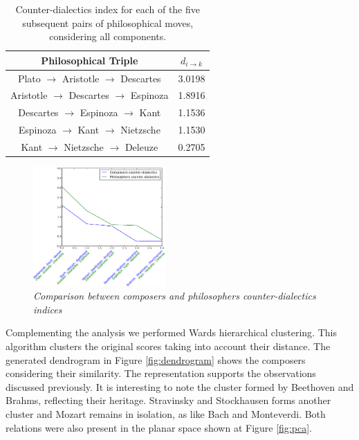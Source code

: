 \documentclass[
 aip,
 jmp,
 amsmath,amssymb,
 reprint,
]{revtex4-1}
\begin{document}
\begin{table}%
\caption{\label{tab:tablephiE} Counter-dialectics index for each
of the five subsequent pairs of philosophical moves, considering all components.}

\begin{tabular}{|c||c|}
\hline
Philosophical Triple & $d_{i \rightarrow k}$ \\
\hline \hline
Plato $\rightarrow$ Aristotle $\rightarrow$ Descartes    & 3.0198 \\
Aristotle $\rightarrow$ Descartes $\rightarrow$ Espinoza & 1.8916 \\
Descartes $\rightarrow$ Espinoza $\rightarrow$ Kant      & 1.1536 \\
Espinoza $\rightarrow$ Kant $\rightarrow$ Nietzsche      & 1.1530 \\
Kant $\rightarrow$ Nietzsche $\rightarrow$ Deleuze       & 0.2705 \\
\hline
\end{tabular}
\end{table}

\begin{figure}[ht]
        \begin{center}
                \includegraphics[width=0.45\textwidth]{compara_dialeticas2}
        \end{center}
        \caption{\it Comparison between composers and philosophers
          counter-dialectics indices}
        \label{fig:comparingdialectics}
\end{figure}

Complementing the analysis we performed Wards hierarchical
clustering. This algorithm clusters the original scores taking into
account their distance. The generated dendrogram in
Figure \ref{fig:dendrogram} shows the composers
considering their similarity. The representation supports the
observations discussed previously. It is interesting to note the cluster
formed by Beethoven and Brahms, reflecting their heritage. Stravinsky
and Stockhausen forms another cluster and Mozart remains in isolation,
as like Bach and Monteverdi. Both relations were also present in the
planar space shown at Figure \ref{fig:pca}.
\end{document}
